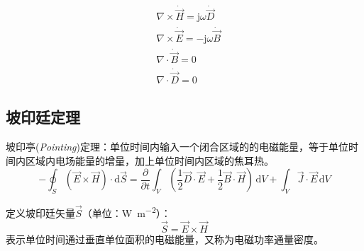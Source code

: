        \begin{subequations}
            \begin{align}
                &\nabla\times \dot{\vec{H}}=\mathrm{j}\omega \dot{\vec{D}} \\
                &\nabla\times \dot{\vec{E}}=-\mathrm{j}\omega \dot{\vec{B}} \\
                &\nabla\cdot \dot{\vec{B}}=0\\            
                &\nabla\cdot \dot{\vec{D}}=0
            \end{align}
        \end{subequations}


    \subsection{坡印廷定理}
        坡印亭(\emph{Pointing})定理：单位时间内输入一个闭合区域的的电磁能量，等于单位时间内区域内电场能量的增量，加上单位时间内区域的焦耳热。
        \begin{equation}
            -\oint_S\left(\vec{E}\times \vec{H}\right)\cdot \mathrm{d}\vec{S}
            =\frac{\partial }{\partial t}\int_V (\frac{1}{2}\vec{D}\cdot \vec{E}+\frac{1}{2}\vec{B}\cdot \vec{H})\,\mathrm{d}V
            +\int_V \vec{J}\cdot \vec{E}\,\mathrm{d}V
        \end{equation}

        定义坡印廷矢量$\vec{S}$（单位：\si{\watt\per\square\metre}）：
        \begin{equation}
            \vec{S}=\vec{E}\times\vec{H}
        \end{equation}
        表示{\color{red}单位时间通过垂直单位面积的电磁能量}，又称为{\color{red}电磁功率通量密度}。

